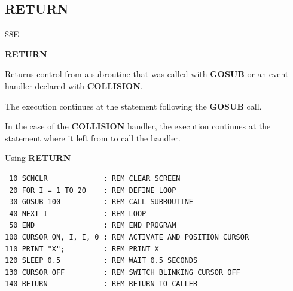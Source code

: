 \subsection{RETURN}
\begin{description}[leftmargin=2cm,style=nextline]
\item [Token:]    \$8E

\item [Format:]   {\bf RETURN}

\item [Usage:]    Returns control from a subroutine that was called with {\bf GOSUB} or an event handler declared with {\bf COLLISION}.

                  The execution continues at the statement following the {\bf GOSUB} call.

                  In the case of the {\bf COLLISION} handler, the execution continues at the statement where it left from to call the handler.

\item [Example:]  Using {\bf RETURN}

\begin{tcolorbox}[colback=black,coltext=white]
\verbatimfont{\codefont}
\begin{verbatim}
 10 SCNCLR             : REM CLEAR SCREEN
 20 FOR I = 1 TO 20    : REM DEFINE LOOP
 30 GOSUB 100          : REM CALL SUBROUTINE
 40 NEXT I             : REM LOOP
 50 END                : REM END PROGRAM
100 CURSOR ON, I, I, 0 : REM ACTIVATE AND POSITION CURSOR
110 PRINT "X";         : REM PRINT X
120 SLEEP 0.5          : REM WAIT 0.5 SECONDS
130 CURSOR OFF         : REM SWITCH BLINKING CURSOR OFF
140 RETURN             : REM RETURN TO CALLER
\end{verbatim}
\end{tcolorbox}
\end{description}


\newpage

